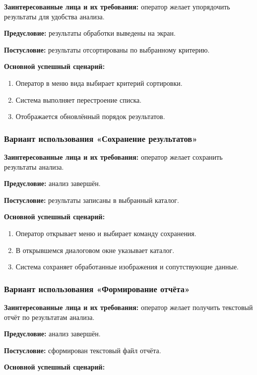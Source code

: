 \textbf{Заинтересованные лица и их требования:} оператор желает упорядочить результаты для удобства анализа.

\textbf{Предусловие:} результаты обработки выведены на экран.

\textbf{Постусловие:} результаты отсортированы по выбранному критерию.

\textbf{Основной успешный сценарий:}

\begin{enumerate}
	\item Оператор в меню вида выбирает критерий сортировки.
	\item Система выполняет перестроение списка.
	\item Отображается обновлённый порядок результатов.
\end{enumerate}

\subsubsection{Вариант использования «Сохранение результатов»}

\textbf{Заинтересованные лица и их требования:} оператор желает сохранить результаты анализа.

\textbf{Предусловие:} анализ завершён.

\textbf{Постусловие:} результаты записаны в выбранный каталог.

\textbf{Основной успешный сценарий:}

\begin{enumerate}
	\item Оператор открывает меню и выбирает команду сохранения.
	\item В открывшемся диалоговом окне указывает каталог.
	\item Система сохраняет обработанные изображения и сопутствующие данные.
\end{enumerate}

\subsubsection{Вариант использования «Формирование отчёта»}

\textbf{Заинтересованные лица и их требования:} оператор желает получить текстовый отчёт по результатам анализа.

\textbf{Предусловие:} анализ завершён.

\textbf{Постусловие:} сформирован текстовый файл отчёта.

\textbf{Основной успешный сценарий:}

